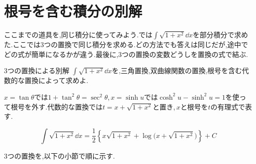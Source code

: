 \section{根号を含む積分の別解}\label{節:根号積分の三方法}

ここまでの道具を,同じ積分に使ってみよう.では$\int\sqrt{1+x^2}\dd x$を部分積分で求めた.ここでは3つの置換で同じ積分を求める.どの方法でも答えは同じだが,途中でどの式が簡単になるかが違う.最後に,3つの置換の変数どうしを置換の式で結ぶ.

\begin{example}{3つの置換による別解}
$\int\sqrt{1+x^2}\dd x$を,三角置換,双曲線関数の置換,根号を含む代数的な置換によって求めよ.
\end{example}

$x=\tan\theta$では$1+\tan^2\theta=\sec^2\theta$,\,$x=\sinh u$では$\cosh^2u-\sinh^2u=1$を使って根号を外す.代数的な置換では$t=x+\sqrt{1+x^2}$と置き,\,$x$と根号を$t$の有理式で表す.

\[
\int\sqrt{1+x^2}\dd x
=\frac12\left\{x\sqrt{1+x^2}
+\log\bigl(x+\sqrt{1+x^2}\bigr)\right\}+C
\]

3つの置換を,以下の小節で順に示す.

%
%
%
